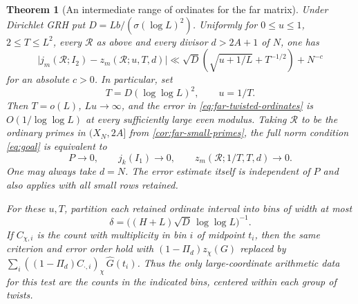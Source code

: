 \documentclass[11pt,a4paper]{article}
\numberwithin{equation}{section}
\newtheorem{theorem}{Theorem}[section]
\begin{document}
\begin{theorem}[An intermediate range of ordinates for the far matrix]
\label{thm:far-twisted-ordinates}
Under Dirichlet GRH put $D=Lb/(\sigma(\log L)^2)$. Uniformly for
$0\le u\le1$, $2\le T\le L^2$, every $\mathcal R$ as above and
every divisor $d>2A+1$ of $N$, one has
\begin{equation}
 \big|j_m(\mathcal R;I_2)-z_m(\mathcal R;u,T,d)\big|
 \ll \sqrt D\left(\sqrt{u+1/L}+T^{-1/2}\right)+N^{-c}
 \label{eq:far-twisted-ordinates}
\end{equation}
for an absolute $c>0$. In particular, set
\[
 T=D(\log\log L)^2,\qquad u=1/T .
\]
Then $T=o(L)$, $Lu\to\infty$, and the error in
\eqref{eq:far-twisted-ordinates} is $O(1/\log\log L)$ at every
sufficiently large even modulus. Taking $\mathcal R$ to be the
ordinary primes in $(X_N,2A]$ from \cref{cor:far-small-primes},
the full norm condition \eqref{eq:goal} is equivalent to
\[
 P\to0,\qquad j_k(I_1)\to0,\qquad z_m(\mathcal R;1/T,T,d)\to0 .
\]
One may always take $d=N$. The error estimate itself is independent
of $P$ and also applies with all small rows retained.

For these $u,T$, partition each retained ordinate interval into
bins of width at most
\[
 \delta=\big((H+L)\sqrt D\,\log\log L\big)^{-1}.
\]
If $C_{\chi,i}$ is the count with multiplicity in bin $i$ of
midpoint $t_i$, then the same criterion and error order hold
with $(1-\Pi_d)z_\chi(G)$ replaced by
$\sum_i ((1-\Pi_d)C_{\cdot,i})_\chi\,\widehat G(t_i)$.
Thus the only large-coordinate arithmetic data for this test
are the counts in the indicated bins, centered within each
group of twists.
\end{theorem}
\end{document}
